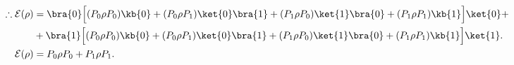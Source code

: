 		\begin{align*}
			\therefore \mathcal{E}(\rho) 
			&= \bra{0}\Big[ (P_0\rho P_0) \kb{0} + (P_0\rho P_1) \ket{0}\bra{1} +  (P_1\rho P_0) \ket{1}\bra{0} + (P_1\rho P_1) \kb{1} \Big]\ket{0} +\\
			&+ \bra{1}\Big[ (P_0\rho P_0) \kb{0} + (P_0\rho P_1) \ket{0}\bra{1} +  (P_1\rho P_0) \ket{1}\bra{0} + (P_1\rho P_1) \kb{1} \Big]\ket{1}.\\
			\mathcal{E}(\rho) &= P_0\rho P_0 + P_1\rho P_1.
		\end{align*}


